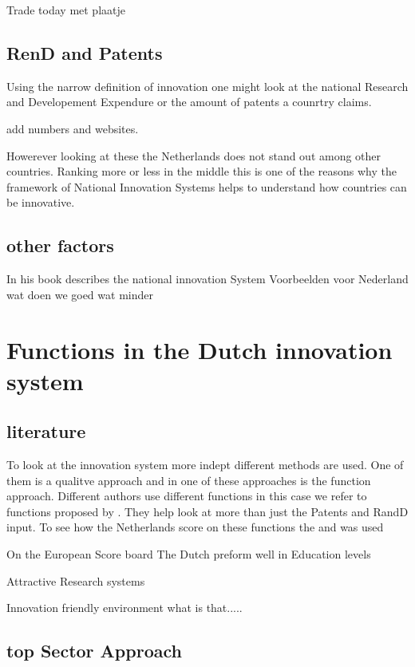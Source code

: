 \documentclass[a4paper, 11pt]{article}
\begin{document}
Trade today met plaatje


\subsection{RenD and Patents}

Using the narrow definition of innovation one might look at the national Research and Developement Expendure or the amount of patents a counrtry claims.

add numbers and websites.

Howerever looking at these the Netherlands does not stand out among other countries. Ranking more or less in the middle this is one of the reasons why the framework of National Innovation Systems helps to understand how countries can be innovative. 


\subsection{other factors}

In his book \cite{Christensen97} describes the national innovation System 
Voorbeelden voor Nederland wat doen we goed wat minder

\section{Functions in the Dutch innovation system}
\subsection{literature}

To look at the innovation system more indept different methods are used. One of them is a qualitve approach and in \cite{chaminade2018} one of these approaches is the function approach. Different authors use different functions in this case we refer to functions proposed by \cite{hekkert2007}. They help look at more than just the Patents and RandD input. 
To see how the Netherlands score on these functions the \cite{europea2018} and \cite{Global2018} was used


On the European Score board The Dutch preform well in Education levels



Attractive Research systems 


Innovation friendly environment what is that.....


\subsection{top Sector Approach}
\end{document}
